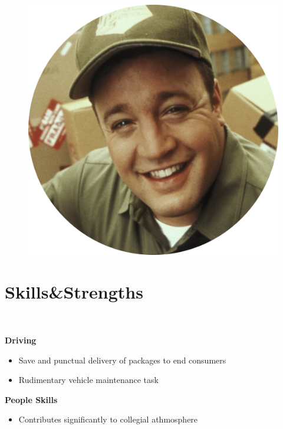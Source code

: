 \documentclass[]{friggeri-cv_reccius-experiment}
\begin{document}
\begin{aside}
    ~

\vspace{-3.5cm}
\begin{figure}[ht]
	\hspace{0.3cm}
	\includegraphics[width=.71\linewidth]{img/Doug.png}
\end{figure}

\newcommand{\skillspace}{\vspace*{-0.75mm}}
  \vspace{-2.9mm}
  \section{Skills\thinspace \&\thinspace Strengths}\\
  \vspace{3.5mm}
    
	\textbf{Driving}\\\vspace{0.4mm}
	\begin{itemize}[leftmargin=*, noitemsep]
	\item Save and punctual delivery of packages to end consumers
	\item Rudimentary vehicle maintenance task\\
	\end{itemize}	

  	\skillspace
    	\textbf{People Skills}\\\vspace{0.2mm}
	\begin{itemize}[leftmargin=*, noitemsep]	
	\item Contributes significantly to collegial athmosphere\\
	\end{itemize}	


\end{aside}
\end{document}
